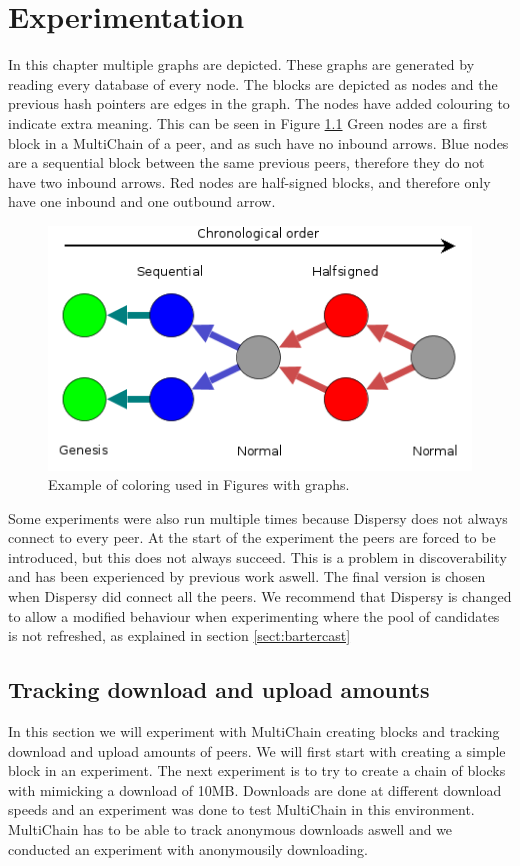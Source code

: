 \chapter{Experimentation}

In this chapter multiple graphs are depicted.
These graphs are generated by reading every database of every node.
The blocks are depicted as nodes and the previous hash pointers are edges in the graph.
The nodes have added colouring to indicate extra meaning.
This can be seen in Figure \ref{fig:graph-example}
Green nodes are a first block in a MultiChain of a peer,
and as such have no inbound arrows.
Blue nodes are a sequential block between the same previous peers,
therefore they do not have two inbound arrows.
Red nodes are half-signed blocks,
and therefore only have one inbound and one outbound arrow.

\begin{figure}[!h]
	\centerline{\includegraphics[scale=0.6]{experimentation/example.png}}
	\caption{Example of coloring used in Figures with graphs.}
	\label{fig:graph-example}
\end{figure}

Some experiments were also run multiple times because Dispersy does not always connect to every peer.
At the start of the experiment the peers are forced to be introduced,
but this does not always succeed.
This is a problem in discoverability and has been experienced by previous work aswell\cite{ruigrok-anonymous}.
The final version is chosen when Dispersy did connect all the peers.
We recommend that Dispersy is changed to allow a modified behaviour when experimenting
where the pool of candidates is not refreshed,
as explained in section \ref{sect:bartercast}



\section{Tracking download and upload amounts}
In this section we will experiment with MultiChain creating blocks and tracking download and upload amounts of peers.
We will first start with creating a simple block in an experiment.
The next experiment is to try to create a chain of blocks with mimicking a download of 10MB.
Downloads are done at different download speeds and an experiment was done to test MultiChain in this environment.
MultiChain has to be able to track anonymous downloads aswell
and we conducted an experiment with anonymousily downloading.








